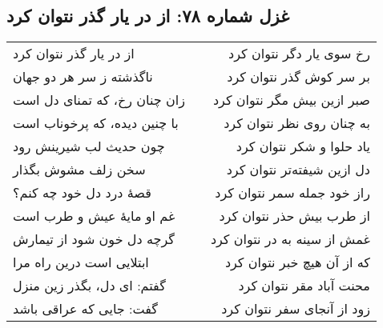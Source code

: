 \begin{center}
\section*{غزل شماره ۷۸: از در یار گذر نتوان کرد}
\label{sec:078}
\begin{longtable}{l p{0.5cm} r}
از در یار گذر نتوان کرد
&&
رخ سوی یار دگر نتوان کرد
\\
ناگذشته ز سر هر دو جهان
&&
بر سر کوش گذر نتوان کرد
\\
زان چنان رخ، که تمنای دل است
&&
صبر ازین بیش مگر نتوان کرد
\\
با چنین دیده، که پرخوناب است
&&
به چنان روی نظر نتوان کرد
\\
چون حدیث لب شیرینش رود
&&
یاد حلوا و شکر نتوان کرد
\\
سخن زلف مشوش بگذار
&&
دل ازین شیفته‌تر نتوان کرد
\\
قصهٔ درد دل خود چه کنم؟
&&
راز خود جمله سمر نتوان کرد
\\
غم او مایهٔ عیش و طرب است
&&
از طرب بیش حذر نتوان کرد
\\
گرچه دل خون شود از تیمارش
&&
غمش از سینه به در نتوان کرد
\\
ابتلایی است درین راه مرا
&&
که از آن هیچ خبر نتوان کرد
\\
گفتم: ای دل، بگذر زین منزل
&&
محنت آباد مقر نتوان کرد
\\
گفت: جایی که عراقی باشد
&&
زود از آنجای سفر نتوان کرد
\\
\end{longtable}
\end{center}
